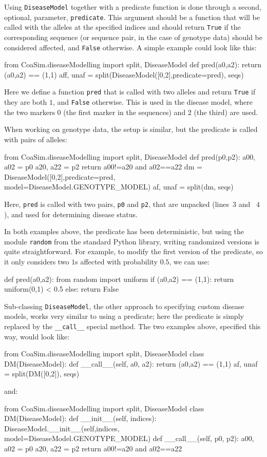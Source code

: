 \documentclass{manual}
\begin{document}
\begin{empfile}
Using \texttt{DiseaseModel} together with a predicate function is done
through a second, optional, parameter, \texttt{predicate}.  This
argument should be a function that will be called with the alleles at
the specified indices and should return \texttt{True} if the
corresponding sequence (or sequence pair, in the case of genotype
data) should be considered affected, and \texttt{False} otherwise.  A
simple example could look like this:
\begin{code}
from CoaSim.diseaseModelling import split, DiseaseModel
def pred(a0,a2): return (a0,a2) == (1,1)
aff, unaf = split(DiseaseModel([0,2],predicate=pred), seqs)
\end{code}

\noindent
Here we define a function \texttt{pred} that is called with two
alleles and return \texttt{True} if they are both $1$, and
\texttt{False} otherwise.  This is used in the disease model, where
the two markers $0$ (the first marker in the sequences) and $2$ (the
third) are used.

When working on genotype data, the setup is similar, but the predicate
is called with pairs of alleles:
\begin{ncode}
from CoaSim.diseaseModelling import split, DiseaseModel
def pred(p0,p2):
    a00, a02 = p0
    a20, a22 = p2
    return a00!=a20 and a02==a22
dm = DiseaseModel([0,2],predicate=pred,
                  model=DiseaseModel.GENOTYPE_MODEL)
af, unaf = split(dm, seqs)
\end{ncode}
Here, \texttt{pred} is called with two pairs, \texttt{p0} and
\texttt{p2}, that are unpacked (lines~$3$ and~ $4$), and used for
determining disease status.

In both examples above, the predicate has been deterministic, but
using the module \texttt{random} from the standard Python library,
writing randomized versions is quite straightforward.  For example, to
modify the first version of the predicate, so it only considers two
$1$s affected with probability $0.5$, we can use:
\begin{code}
def pred(a0,a2):
    from random import uniform
    if (a0,a2) == (1,1): return uniform(0,1) < 0.5
    else:                return False
\end{code}

Sub-classing \texttt{DiseaseModel}, the other approach to specifying
custom disease models, works very similar to using a predicate; here
the predicate is simply replaced by the \texttt{\_\_call\_\_} special
method.  The two examples above, specified this way, would look like:
\begin{code}
from CoaSim.diseaseModelling import split, DiseaseModel
class DM(DiseaseModel):
    def __call__(self, a0, a2):
        return (a0,a2) == (1,1)
af, unaf = split(DM([0,2]), seqs)
\end{code}
and:
\begin{code}
from CoaSim.diseaseModelling import split, DiseaseModel
class DM(DiseaseModel):
    def __init__(self, indices):
        DiseaseModel.__init__(self,indices,
                              model=DiseaseModel.GENOTYPE_MODEL)
    def __call__(self, p0, p2):
        a00, a02 = p0
        a20, a22 = p2
        return a00!=a20 and a02==a22


\end{code}
\end{empfile}
\end{document}
